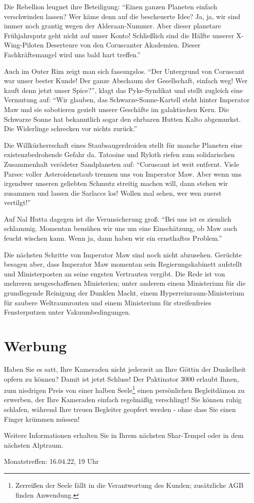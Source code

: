 \documentclass[final]{multiversum}
\begin{document}
Die Rebellion leugnet ihre Beteiligung: \enquote{Einen ganzen Planeten einfach verschwinden lassen? 
Wer käme denn auf die bescheuerte Idee? 
Ja, ja, wir sind immer noch grantig wegen der Alderaan-Nummer. 
Aber dieser planetare Frühjahrsputz geht nicht auf unser Konto! 
Schließlich sind die Hälfte unserer X-Wing-Piloten Deserteure von den Coruscanter Akademien. 
Dieser Fachkräftemangel wird uns bald hart treffen.}

Auch im Outer Rim zeigt man sich fassungslos. 
\enquote{Der Untergrund von Coruscant war unser bester Kunde! 
Der ganze Abschaum der Gesellschaft, einfach weg! 
Wer kauft denn jetzt unser Spice?}, klagt das Pyke-Syndikat und stellt zugleich eine Vermutung auf: 
\enquote{Wir glauben, das Schwarze-Sonne-Kartell steht hinter Imperator Maw und sie sabotieren gezielt unsere Geschäfte im galaktischen Kern. 
Die Schwarze Sonne hat bekanntlich sogar den ehrbaren Hutten Kalto abgemurkst. 
Die Widerlinge schrecken vor nichts zurück.}

Die Willkürherrschaft eines Staubsaugerdroiden stellt für manche Planeten eine existenzbedrohende Gefahr da. 
Tatooine und Ryloth riefen zum solidarischen Zusammenhalt verödeter Sandplaneten auf: 
\enquote{Coruscant ist weit entfernt. 
Viele Parsec voller Asteroidenstaub trennen uns von Imperator Maw. 
Aber wenn uns irgendwer unseren geliebten Schmutz streitig machen will, dann stehen wir zusammen und lassen die Sarlaccs los! 
Wollen mal sehen, wer wen zuerst vertilgt!}

Auf Nal Hutta dagegen ist die Verunsicherung groß. 
\enquote{Bei uns ist es ziemlich schlammig. 
Momentan bemühen wir uns um eine Einschätzung, ob Maw auch feucht wischen kann. 
Wenn ja, dann haben wir ein ernsthaftes Problem.}

Die nächsten Schritte von Imperator Maw sind noch nicht abzusehen. 
Gerüchte besagen aber, dass Imperator Maw momentan sein Regierungskabinett aufstellt und Ministerposten an seine engsten Vertrauten vergibt. 
Die Rede ist von mehreren neugeschaffenen Ministerien; unter anderem einem Ministerium für die grundlegende Reinigung der Dunklen Macht, einem Hyperreinraum-Ministerium für saubere Weltraumrouten und einem Ministerium für streifenfreies Fensterputzen unter Vakuumbedingungen.

\section{Werbung}

Haben Sie es satt, Ihre Kameraden nicht jederzeit an Ihre Göttin der Dunkelheit opfern zu können? 
Damit ist jetzt Schluss! Der Paktinator 3000 erlaubt Ihnen, zum niedrigen Preis von einer halben Seele\footnote{Zerreißen der Seele fällt in die Verantwortung des Kunden; zusätzliche AGB finden Anwendung.} einen persönlichen Begleitdämon zu erwerben, der Ihre Kameraden einfach regelmäßig verschlingt! Sie können ruhig schlafen, während Ihre treuen Begleiter geopfert werden - ohne dass Sie einen Finger krümmen müssen! 

Weitere Informationen erhalten Sie in Ihrem nächsten Shar-Tempel oder in dem nächsten Alptraum. 

\begin{termine}
\item Monatstreffen: 16.04.22, 19 Uhr
\end{termine}
\impressum
\end{document}
